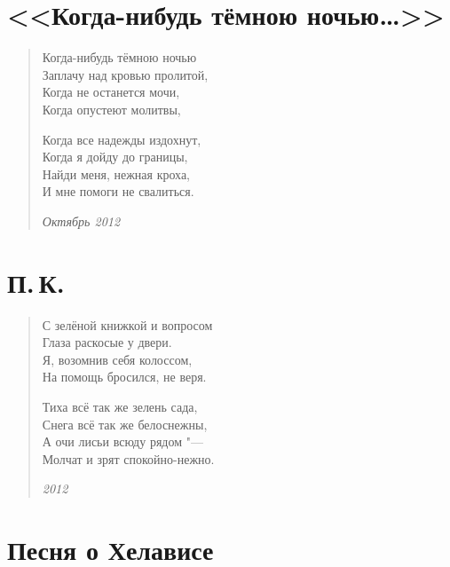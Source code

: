 \documentclass[a4paper,12pt]{article}
\begin{document}
\tableofcontents

\newpage

\section{<<Когда-нибудь тёмною ночью\ldots>>}

\begin{verse}
Когда-нибудь тёмною ночью\\
Заплачу над кровью пролитой,\\
Когда не останется мочи,\\
Когда опустеют молитвы,

Когда все надежды издохнут,\\
Когда я дойду до границы,\\
Найди меня, нежная кроха,\\
И мне помоги не свалиться.

\emph{Октябрь 2012}
\end{verse}
\newpage

\section{П.\,К.}

\begin{verse}
С зелёной книжкой и вопросом\\
Глаза раскосые у двери.\\
Я, возомнив себя колоссом,\\
На помощь бросился, не веря.

Тиха всё так же зелень сада,\\
Снега всё так же белоснежны,\\
А очи лисьи всюду рядом "---\\
Молчат и зрят спокойно-нежно.

\emph{2012}
\end{verse}
\newpage

\section{Песня о Хелависе}
\end{document}
